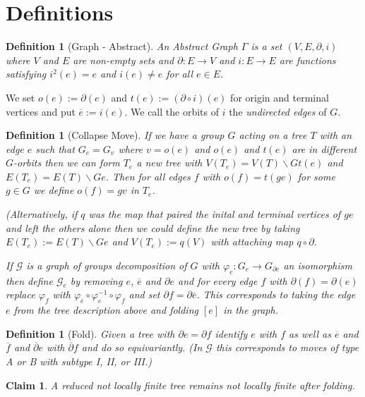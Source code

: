 \documentclass{article}
\theoremstyle{mystyle}
\newtheorem{defn}[lem]{Definition}
\newtheorem*{claim*}{Claim}
\theoremstyle{remark}
\begin{document}
\section{Definitions}
\begin{defn}[Graph - Abstract]
	An {\em Abstract Graph} \(\Gamma\) is a set \((V,E, \partial, i)\) where \(V\) and \(E\) are non-empty sets and \(\partial: E \to V\) and \(i: E \to E\) are functions satisfying \(i^2(e)=e\) and \(i(e) \neq e\) for all \(e \in E\). 
\end{defn}

We set \(o(e) := \partial(e)\) and \(t(e) := (\partial\circ i)(e)\) for origin and terminal vertices and put \(\overline{e} := i(e)\). We call the orbits of \(i\) the {\em undirected edges} of \(G\).

\begin{defn}[Collapse Move]
	If we have a group \(G\) acting on a tree \(T\) with an edge \(e\) such that \(G_{e} = G_{v}\) where \(v=o(e)\) and \(o(e)\) and \(t(e)\) are in different \(G\)-orbits then we can form \(T_{e}\) a new tree with \(V(T_{e} )=V(T)\smallsetminus G t(e)\) and \(E(T_{e} )=E(T) \smallsetminus Ge\). Then for all edges \(f\) with \(o(f) = t(ge)\) for some \(g \in G\) we define \(o(f)=gv\) in \(T_{e}\). 
	
	(Alternatively, if \(q\) was the map that paired the inital and terminal vertices of \(g e\) and left the others alone then we could define the new tree by taking \(E(T_{e} ):=E(T)\smallsetminus Ge \) and \(V(T_{e} ):=q(V)\) with attaching map \(q \circ \partial\).

	If \(\mathcal{G}\) is a graph of groups decomposition of \(G\) with \(\varphi_{e}: G_{e} \to G_{\partial e}\) an isomorphism then define \(\mathcal{G}_{e}\) by removing \(e\), \(\overline{e}\) and \(\partial e\) and for every edge \(f\) with \(\partial(f) = \partial(e)\) replace \(\varphi_{f}\) with \(\varphi_{\overline{e}} \circ \varphi_{e}^{-1} \circ \varphi_{f}\) and set \(\partial f = \partial \overline{e}\). This corresponds to taking the edge \(e\) from the tree description above and folding \([e]\) in the graph.

\end{defn}
\begin{defn}[Fold]
	Given a tree with \(\partial e = \partial f\) identify \(e\) with \(f\) as well as \(\overline{e}\) and \(\overline{f}\) and \(\overline{\partial} e\) with \(\overline{\partial} f\) and do so equivariantly. (In \(\mathcal{G}\) this corresponds to moves of type A or B with subtype I, II, or III.)
\end{defn}

\begin{claim*} A reduced not locally finite tree remains not locally finite after folding.
\end{claim*}

\hrulefill
\end{document}
